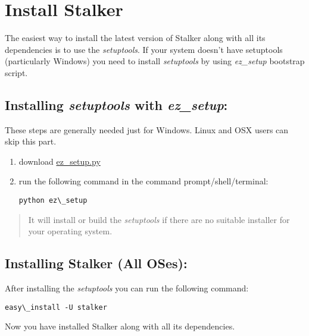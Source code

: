 \documentclass[a4paper,10pt,english]{sphinxmanual}
\begin{document}
\section{Install Stalker}
\label{installation:python-org}\label{installation:install-stalker}
The easiest way to install the latest version of Stalker along with all its
dependencies is to use the \emph{setuptools}. If your system doesn't have setuptools
(particularly Windows) you need to install \emph{setuptools} by using \emph{ez\_setup}
bootstrap script.


\subsection{Installing \emph{setuptools} with \emph{ez\_setup}:}
\label{installation:installing-setuptools-with-ez-setup}
These steps are generally needed just for Windows. Linux and OSX users can skip
this part.
\begin{enumerate}
\item {} 
download \href{http://peak.telecommunity.com/dist/ez\_setup.py}{ez\_setup.py}

\item {} 
run the following command in the command prompt/shell/terminal:

\begin{Verbatim}[commandchars=\\\{\}]
python ez\_setup
\end{Verbatim}

\end{enumerate}
\begin{quote}

It will install or build the \emph{setuptools} if there are no suitable installer
for your operating system.
\end{quote}


\subsection{Installing Stalker (All OSes):}
\label{installation:ez-setup-py}\label{installation:installing-stalker-all-oses}
After installing the \emph{setuptools} you can run the following command:

\begin{Verbatim}[commandchars=\\\{\}]
easy\_install -U stalker
\end{Verbatim}

Now you have installed Stalker along with all its dependencies.
\end{document}
